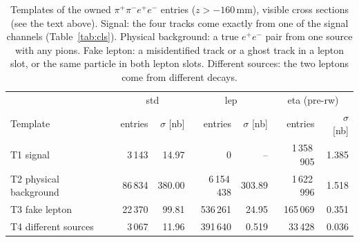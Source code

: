 \documentclass[11pt,a4paper]{article}
\newcommand{\ee}{\ensuremath{e^{+}e^{-}}\xspace}
\newcommand{\ppee}{\ensuremath{\pi^{+}\pi^{-}e^{+}e^{-}}\xspace}
\begin{document}
\begin{table}[!htbp]
\centering
\caption{Templates of the owned \ppee entries ($z>-160$\,mm), visible cross sections (see the text
above). Signal: the four tracks come exactly from one of the signal channels
(Table~\ref{tab:cls}). Physical background: a true \ee pair from one source with any pions. Fake
lepton: a misidentified track or a ghost track in a lepton slot, or the same particle in both
lepton slots. Different sources: the two leptons come from different decays.}
\label{tab:tmpl}
\begin{tabular}{@{}l rr rr rr@{}}
\toprule
 & \multicolumn{2}{c}{std} & \multicolumn{2}{c}{lep} & \multicolumn{2}{c}{eta (pre-rw)} \\
Template & entries & $\sigma$ [nb] & entries & $\sigma$ [nb] & entries & $\sigma$ [nb] \\
\midrule
T1 signal              &  3\,143 & 14.97 &           0 & --     & 1\,358\,905 & 1.385 \\
T2 physical background & 86\,834 & 380.00 & 6\,154\,438 & 303.89 &  1\,622\,996 & 1.518 \\
T3 fake lepton         & 22\,370 & 99.81 &    536\,261 & 24.95 &    165\,069 & 0.351 \\
T4 different sources   &  3\,067 & 11.96 &    391\,640 & 0.519 &     33\,428 & 0.036 \\
\bottomrule
\end{tabular}
\end{table}
\end{document}
